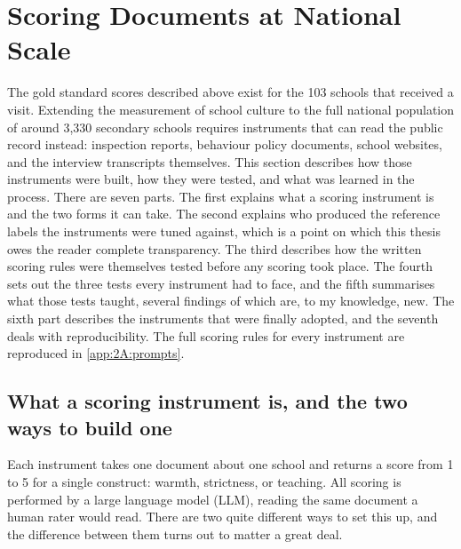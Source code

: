 
\section{Scoring Documents at National Scale}
\label{sec:p1_scoring}

The gold standard scores described above exist for the 103 schools that
received a visit. Extending the measurement of school culture to the full
national population of around 3,330 secondary schools requires instruments
that can read the public record instead: inspection reports, behaviour policy
documents, school websites, and the interview transcripts themselves. This
section describes how those instruments were built, how they were tested, and
what was learned in the process. There are seven parts. The first explains
what a scoring instrument is and the two forms it can take. The second
explains who produced the reference labels the instruments were tuned
against, which is a point on which this thesis owes the reader complete
transparency. The third describes how the written scoring rules were
themselves tested before any scoring took place. The fourth sets out the
three tests every instrument had to face, and the fifth summarises what
those tests taught, several findings of which are, to my knowledge, new. The
sixth part describes the instruments that were finally adopted, and the
seventh deals with reproducibility. The full scoring rules for every
instrument are reproduced in \cref{app:2A:prompts}.

\subsection{What a scoring instrument is, and the two ways to build one}
\label{sec:p1_scoring_arch}

Each instrument takes one document about one school and returns a score from
1 to 5 for a single construct: warmth, strictness, or teaching. All scoring
is performed by a large language model (LLM), reading the same document a
human rater would read. There are two quite different ways to set this up,
and the difference between them turns out to matter a great deal.

